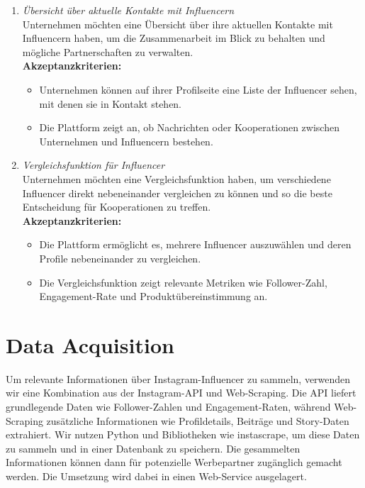 \documentclass[conference,a4paper,flushend]{cs-techrep}
\begin{document}
\begin{enumerate}
\item{\textit{Übersicht über aktuelle Kontakte mit Influencern}}\\
Unternehmen möchten eine Übersicht über ihre aktuellen Kontakte mit Influencern haben, um die Zusammenarbeit im Blick zu behalten und mögliche Partnerschaften zu verwalten.\\
\textbf{Akzeptanzkriterien:}
\begin{itemize}
\item{Unternehmen können auf ihrer Profilseite eine Liste der Influencer sehen, mit denen sie in Kontakt stehen.}
\item{Die Plattform zeigt an, ob Nachrichten oder Kooperationen zwischen Unternehmen und Influencern bestehen.\\}
\end{itemize}

\item{\textit{Vergleichsfunktion für Influencer}}\\
Unternehmen möchten eine Vergleichsfunktion haben, um verschiedene Influencer direkt nebeneinander vergleichen zu können und so die beste Entscheidung für Kooperationen zu treffen.\\
\textbf{Akzeptanzkriterien:}
\begin{itemize}
\item{Die Plattform ermöglicht es, mehrere Influencer auszuwählen und deren Profile nebeneinander zu vergleichen.}
\item{Die Vergleichsfunktion zeigt relevante Metriken wie Follower-Zahl, Engagement-Rate und Produktübereinstimmung an.\\}
\end{itemize}
\end{enumerate}


\section{Data Acquisition}

Um relevante Informationen über Instagram-Influencer zu sammeln, verwenden wir eine Kombination aus der Instagram-API und Web-Scraping. Die API liefert grundlegende Daten wie Follower-Zahlen und Engagement-Raten, während Web-Scraping zusätzliche Informationen wie Profildetails, Beiträge und Story-Daten extrahiert. Wir nutzen Python und Bibliotheken wie instascrape, um diese Daten zu sammeln und in einer Datenbank zu speichern. Die gesammelten Informationen können dann für potenzielle Werbepartner zugänglich gemacht werden. Die Umsetzung wird dabei in einen Web-Service ausgelagert.
\end{document}
